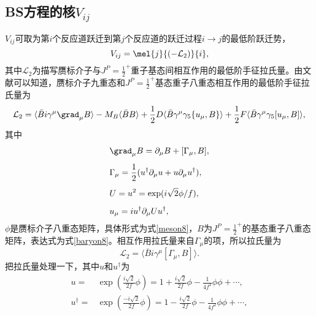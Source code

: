 \subsection{BS方程的核$V_{ij}$}
$V_{ij}$可取为第$i$个反应道跃迁到第$j$个反应道的跃迁过程$i\to j$的最低阶跃迁势，
\begin{equation}
\label{def v}
V_{ij}=\mel{j}{(-\mathcal{L}_{2})}{i},
\end{equation}
其中$\mathcal{L}_{2}$为描写赝标介子与$J^{P}=\frac{1}{2}^{+}$重子基态间相互作用的最低阶手征拉氏量。由文献\cite{OSET199899,Pich_1995,ECKER19951,BERNARD_1995}可以知道，赝标介子九重态和$J^{P}=\frac{1}{2}^{+}$基态重子八重态相互作用的最低阶手征拉氏量为
\begin{equation}
	\mathcal{L}_{2}=\langle\bar{B}i\gamma^{\mu}\grad_{\mu}B\rangle-M_{B}\langle\bar{B}B\rangle+\frac{1}{2}D\langle\bar{B}\gamma^{\mu}\gamma_{5}\{u_{\mu},B\}\rangle+\frac{1}{2}F\langle\bar{B}\gamma^{\mu}\gamma_{5}[u_{\mu},B]\rangle,
\end{equation}
\vspace{-0.5cm}
其中
\vspace{-0.5cm}
\begin{equation}
\begin{split}
	&\grad_{\mu}B=\partial_{\mu}B+[\Gamma_{\mu},B],\\[1ex]
	&\Gamma_{\mu}=\frac{1}{2}(u^{\dagger}\partial_{\mu}u+u\partial_{\mu}u^{\dagger}),\\[1ex]
	&U=u^2=\exp(i\sqrt{2}\phi/f),\\[1ex]
	&u_{\mu}=iu^{\dagger}\partial_{\mu}Uu^{\dagger},
\end{split}
\end{equation}
$\phi$是赝标介子八重态矩阵，具体形式为式\eqref{meson8}，$B$为$J^{P}=\frac{1}{2}^{+}$的基态重子八重态矩阵，表达式为式\eqref{baryon8}。相互作用拉氏量来自$\Gamma_{\mu}$的项，所以拉氏量为
\begin{equation}
	\mathcal{L}_{2}=\langle\bar{B}i\gamma^{\mu}[\Gamma_{\mu},B]\rangle.
\end{equation}
把拉氏量处理一下，其中$u$和$u^{\dagger}$为
\begin{align}
	u=&\exp(\frac{i\sqrt{2}}{2f}\phi)=1+\frac{i\sqrt{2}}{2f}\phi-\frac{1}{4f^2}\phi\phi+\cdots,\\[1ex]
	u^{\dagger}=&\exp(\frac{-i\sqrt{2}}{2f}\phi)=1-\frac{i\sqrt{2}}{2f}\phi-\frac{1}{4f^2}\phi\phi+\cdots,
\end{align}
